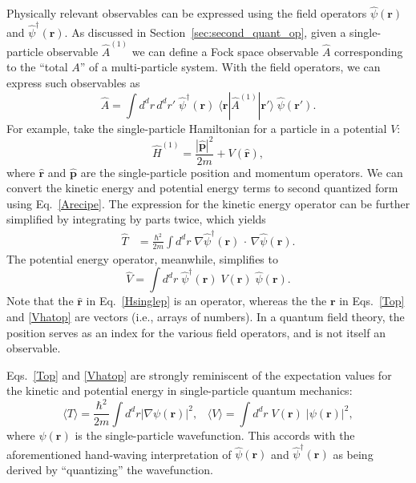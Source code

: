 \documentclass[prx,12pt]{revtex4-2}
\begin{document}
Physically relevant observables can be expressed using the field
operators $\hat{\psi}(\mathbf{r})$ and
$\hat{\psi}^\dagger(\mathbf{r})$.  As discussed in
Section~\ref{sec:second_quant_op}, given a single-particle observable
$\hat{A}^{(1)}$ we can define a Fock space observable $\hat{A}$
corresponding to the ``total $A$'' of a multi-particle system.  With
the field operators, we can express such observables as
\begin{equation}
  \hat{A} = \int d^dr \,d^dr' \;\hat{\psi}^\dagger(\mathbf{r})
  \;\langle \mathbf{r}|\hat{A}^{(1)}|\mathbf{r}'\rangle \; \hat{\psi}(\mathbf{r}').
  \label{Arecipe}
\end{equation}
For example, take the single-particle Hamiltonian for a particle in a
potential $V$:
\begin{equation}
  \hat{H}^{(1)} = \frac{|\hat{\mathbf{p}}|^2}{2m} + V(\hat{\mathbf{r}}),
  \label{Hsinglep}
\end{equation}
where $\hat{\mathbf{r}}$ and $\hat{\mathbf{p}}$ are the
single-particle position and momentum operators.  We can convert the
kinetic energy and potential energy terms to second quantized form
using Eq.~\eqref{Arecipe}.  The expression for the kinetic energy
operator can be further simplified by integrating by parts twice,
which yields
\begin{align}
  \hat{T} &= \frac{\hbar^2}{2m} \int d^d r\; \nabla \hat{\psi}^\dagger
  (\mathbf{r}) \, \cdot \, \nabla \hat{\psi}(\mathbf{r}).
  \label{Top}
\end{align}
The potential energy operator, meanwhile, simplifies to
\begin{equation}
  \hat{V} = \int d^dr \;\hat{\psi}^\dagger(\mathbf{r}) \;V(\mathbf{r}) \; \hat{\psi}(\mathbf{r}).
  \label{Vhatop}
\end{equation}
Note that the $\hat{\mathbf{r}}$ in Eq.~\eqref{Hsinglep} is an
operator, whereas the the $\mathbf{r}$ in Eqs.~\eqref{Top} and
\eqref{Vhatop} are vectors (i.e., arrays of numbers).  In a quantum
field theory, the position serves as an index for the various field
operators, and is not itself an observable.

Eqs.~\eqref{Top} and \eqref{Vhatop} are strongly reminiscent of the
expectation values for the kinetic and potential energy in
single-particle quantum mechanics:
\begin{equation}
  \langle T\rangle = \frac{\hbar^2}{2m} \int d^d r \left|\nabla\psi(\mathbf{r})\right|^2, \;\;\; \langle V\rangle = \int d^dr \; V(\mathbf{r}) \; |\psi(\mathbf{r})|^2,
\end{equation}
where $\psi(\mathbf{r})$ is the single-particle wavefunction.  This
accords with the aforementioned hand-waving interpretation of
$\hat{\psi}(\mathbf{r})$ and $\hat{\psi}^\dagger(\mathbf{r})$ as being
derived by ``quantizing'' the wavefunction.
\end{document}
